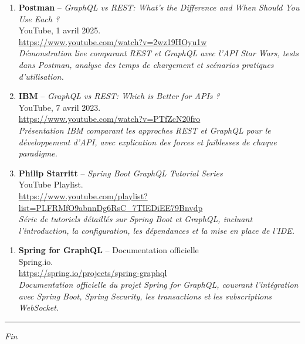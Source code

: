 \documentclass[12pt,a4paper]{article}
\begin{document}
\begin{enumerate}[leftmargin=1.5cm, resume]

    \item \textbf{Postman} -- \textit{GraphQL vs REST: What's the Difference and When Should You Use Each ?} \\
    YouTube, 1 avril 2025. \\
    \url{https://www.youtube.com/watch?v=2wz19HOyu1w} \\
    \textit{Démonstration live comparant REST et GraphQL avec l'API Star Wars, tests dans Postman, analyse des temps de chargement et scénarios pratiques d'utilisation.}

    

    \item \textbf{IBM} -- \textit{GraphQL vs REST: Which is Better for APIs ?} \\
    YouTube, 7 avril 2023. \\
    \url{https://www.youtube.com/watch?v=PTfZcN20fro} \\
    \textit{Présentation IBM comparant les approches REST et GraphQL pour le développement d'API, avec explication des forces et faiblesses de chaque paradigme.}

    
    \item \textbf{Philip Starritt} -- \textit{Spring Boot GraphQL Tutorial Series} \\
    YouTube Playlist. \\
    \url{https://www.youtube.com/playlist?list=PLFRMfO9abnnDg6RsC_7TIEDiEE79Bnvdp} \\
    \textit{Série de tutoriels détaillés sur Spring Boot et GraphQL, incluant l'introduction, la configuration, les dépendances et la mise en place de l'IDE.}



\end{enumerate}

\begin{enumerate}[leftmargin=1.5cm, resume]

    \item \textbf{Spring for GraphQL} -- Documentation officielle \\
    Spring.io. \\
    \url{https://spring.io/projects/spring-graphql} \\
    \textit{Documentation officielle du projet Spring for GraphQL, couvrant l'intégration avec Spring Boot, Spring Security, les transactions et les subscriptions WebSocket.}

\end{enumerate}

\vfill

\begin{center}
\rule{0.5\textwidth}{0.4pt}

\textit{Fin}
\end{center}
\end{document}
